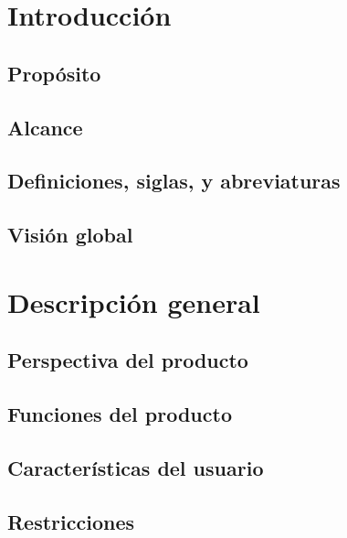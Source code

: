 \chapter{Introducción}
\label{ch:intro}


\section{Propósito}


\section{Alcance}


\section{Definiciones, siglas, y abreviaturas}


\section{Visión global}


\chapter{Descripción general}
\label{Descripción general}

\section{Perspectiva del producto}


\section{Funciones del producto}


\section{Características del usuario}


\section{Restricciones}


